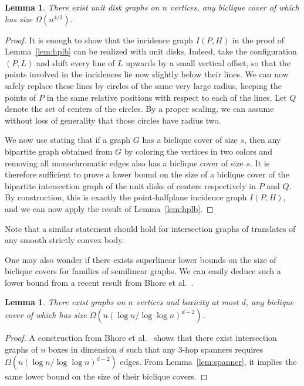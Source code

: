 \documentclass{amsart}
\newtheorem{lemma}[theorem]{Lemma}
\begin{document}
\begin{lemma}
\label{lem:udglb}
There exist unit disk graphs on $n$ vertices, any biclique cover of which has size 
$\Omega (n^{4/3})$.
\end{lemma}
\begin{proof}
It is enough to show that the incidence graph $I(P,H)$ in the proof of Lemma~\ref{lem:hplb} can be realized with unit disks.
Indeed, take the configuration $(P,L)$ and shift every line of $L$ upwards by a small vertical offset, so that the points involved in the incidences lie now slightly below their lines. We can now safely replace these lines by circles of the same very large radius, keeping the points of $P$ in the same relative positions with respect to each of the lines. Let $Q$ denote the set of centers of the circles. By a proper scaling, we can assume without loss of generality that those circles have radius two.

We now use  stating that if a graph $G$ has a biclique cover of size $s$, then any bipartite graph obtained from $G$ by coloring the vertices in two colors and removing all monochromatic edges also has a biclique cover of size $s$. It is therefore sufficient to prove a lower bound on the size of a biclique cover of the bipartite intersection graph of the unit disks of centers respectively in $P$ and $Q$. By construction, this is exactly the point-halfplane incidence graph $I(P,H)$, and we can now apply the result of Lemma~\ref{lem:hplb}.
\end{proof}

Note that a similar statement should hold for intersection graphs of translates of any smooth strictly convex body.

One may also wonder if there exists superlinear lower bounds on the size of biclique covers for families of semilinear graphs. We can easily deduce such a lower bound from a recent result from Bhore et al.~\cite{BCHST25}.

\begin{lemma}
There exist graphs on $n$ vertices and boxicity at most $d$, any biclique cover of which has size $\Omega (n(\log n/\log\log n)^{d-2})$.
\end{lemma}
\begin{proof}
    A construction from Bhore et al.~\cite{BCHST25} shows that there exist intersection graphs of $n$ boxes in dimension $d$ such that any 3-hop spanners requires $\Omega (n(\log n/\log\log n)^{d-2})$ edges. 
    From Lemma~\ref{lem:spanner}, it implies the same lower bound on the size of their biclique covers. 
\end{proof}
\end{document}

